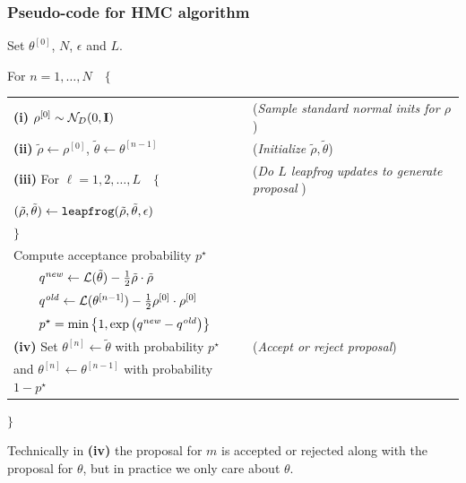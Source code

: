 \subsubsection{Pseudo-code for HMC algorithm}


\noindent Set $\theta^{[0]}$, $N$, $\epsilon$ and $L$.

\noindent For $n = 1, \dots, N \quad \{$ 

\begin{tabular}{ll}
{\bf (i)} $\rho^{[0]} \sim \mathcal{N}_D(0, \mathbf{I})$ & ({\it Sample standard normal inits for $\rho$}) \\

{\bf (ii)} $\tilde{\rho} \leftarrow \rho^{[0]}$, $\tilde{\theta} \leftarrow \theta^{[n-1]}$ &  ({\it Initialize $\tilde{\rho}, \tilde{\theta}$})\\

{\bf (iii)} For $\ell = 1, 2, \dots, L \quad \{$  & ({\it Do $L$ leapfrog updates to generate proposal }) \\[-8pt]

\qquad $(\tilde{\rho}, \tilde{\theta}) \leftarrow {\tt leapfrog}(\tilde{\rho}, \tilde{\theta}, \epsilon)$ & \\[-8pt]
\quad $\}$ & \\

\quad Compute acceptance probability $p^\star$  & \\[-8pt]
$\qquad  q^{\it new} \leftarrow  \mathcal{L}(\tilde{\theta}) - \tfrac{1}{2} \tilde{\rho} \cdot \tilde{\rho} $ & \\[-8pt]
$ \qquad q^{\it old} \leftarrow   \mathcal{L}(\theta^{[n-1]} ) -  \tfrac{1}{2} \rho^{[0]} \cdot \rho^{[0]} $ & \\[-8pt]
$ \qquad p^\star = \min{\left\{1, \exp{\left( q^{\it new} - q^{\it old} \right)} \right\}} $& \\[3pt]

{\bf (iv)} Set $\theta^{[n]} \leftarrow \tilde{\theta}$ with probability $p^\star$  & ({\it Accept or reject proposal})\\
\qquad and $\theta^{[n]} \leftarrow \theta^{[n-1]}$ with probability $ 1 - p^\star$ & \\

\end{tabular}

\noindent $\}$

\noindent Technically in {\bf (iv)} the proposal for $m$ is accepted or rejected along with the proposal for $\theta$, but in practice we only care about $\theta$. 

